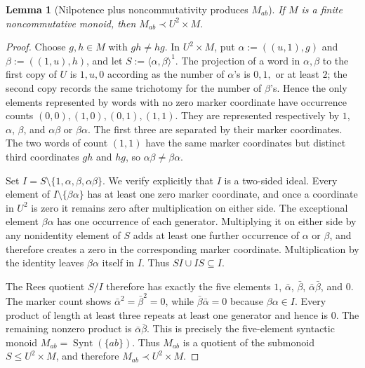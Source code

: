 \documentclass[10pt,a4paper]{article}
\newtheorem{lemma}[theorem]{Lemma}
\theoremstyle{definition}
\theoremstyle{remark}
\begin{document}
\begin{lemma}[Nilpotence plus noncommutativity produces \(M_{ab}\)]
\label{global:lem:mixing}
If \(M\) is a finite noncommutative monoid, then \(M_{ab}\prec U^2\times M.\) \end{lemma}

\begin{proof}
Choose \(g,h\in M\) with \(gh\ne hg\).  In \(U^2\times M\), put
\(\alpha:=((u,1),g)\) and \(\beta:=((1,u),h)\), and let
\(S:=\langle\alpha,\beta\rangle^1\). The projection of a word in
\(\alpha,\beta\) to the first copy of \(U\) is \(1,u,0\) according as the
number of \(\alpha\)'s is \(0,1,\) or at least \(2\); the second copy records
the same trichotomy for the number of \(\beta\)'s. Hence the only elements
represented by words with no zero marker coordinate have occurrence counts
\((0,0),(1,0),(0,1),(1,1)\). They are represented respectively by \(1\), \(\alpha\), \(\beta\), and
\(\alpha\beta\) or \(\beta\alpha\).
The first three are separated by their marker coordinates. The two words of
count \((1,1)\) have the same marker coordinates but distinct third
coordinates \(gh\) and \(hg\), so \(\alpha\beta\ne\beta\alpha\).

Set
\(
I=S\setminus\{1,\alpha,\beta,\alpha\beta\}.
\)
We verify explicitly that \(I\) is a two-sided ideal. Every element of
\(I\setminus\{\beta\alpha\}\) has at least one zero marker coordinate, and
once a coordinate in \(U^2\) is zero it remains zero after multiplication on
either side. The exceptional element \(\beta\alpha\) has one occurrence of
each generator. Multiplying it on either side by any nonidentity element of
\(S\) adds at least one further occurrence of \(\alpha\) or \(\beta\), and
therefore creates a zero in the corresponding marker coordinate.
Multiplication by the identity leaves \(\beta\alpha\) itself in \(I\). Thus
\(SI\cup IS\subseteq I\).

The Rees quotient \(S/I\) therefore has exactly the five elements
\(1\), \(\bar\alpha\), \(\bar\beta\), \(\bar\alpha\bar\beta\), and \(0\).
The marker count shows
\(\bar\alpha^2=\bar\beta^2=0\), while
\(\bar\beta\bar\alpha=0\) because \(\beta\alpha\in I\). Every product of
length at least three repeats at least one generator and hence is \(0\). The
remaining nonzero product is \(\bar\alpha\bar\beta\). This is precisely the
five-element syntactic monoid
\(M_{ab}=\operatorname{Synt}(\{ab\})\).
Thus \(M_{ab}\) is a quotient of the submonoid
\(S\le U^2\times M\), and therefore \(M_{ab}\prec U^2\times M\).
\end{proof}
\end{document}
